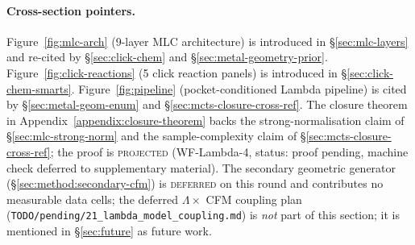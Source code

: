 \paragraph{Cross-section pointers.}
Figure~\ref{fig:mlc-arch} (9-layer MLC architecture) is introduced
in \S\ref{sec:mlc-layers} and re-cited by \S\ref{sec:click-chem}
and \S\ref{sec:metal-geometry-prior}.
Figure~\ref{fig:click-reactions} (5 click reaction panels) is
introduced in \S\ref{sec:click-chem-smarts}.
Figure~\ref{fig:pipeline} (pocket-conditioned Lambda pipeline) is
cited by \S\ref{sec:metal-geom-enum} and
\S\ref{sec:mcts-closure-cross-ref}.
The closure theorem in Appendix~\ref{appendix:closure-theorem}
backs the strong-normalisation claim of
\S\ref{sec:mlc-strong-norm} and the sample-complexity claim of
\S\ref{sec:mcts-closure-cross-ref}; the proof is
\textsc{projected} (WF-Lambda-4, status: proof pending, machine
check deferred to supplementary material).
The secondary geometric generator (\S\ref{sec:method:secondary-cfm})
is \textsc{deferred} on this round and contributes no measurable
data cells; the deferred $\Lambda \times$ CFM coupling plan
(\texttt{TODO/pending/21\_lambda\_model\_coupling.md}) is
\emph{not} part of this section; it is mentioned in
\S\ref{sec:future} as future work.